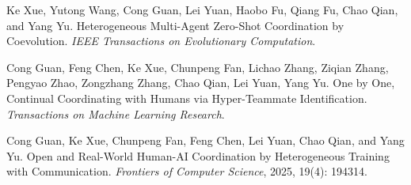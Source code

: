 \documentclass[11pt,a4paper]{article}
\begin{document}
\begin{cvbullet}
  \item Ke Xue, Yutong Wang, Cong Guan, Lei Yuan, Haobo Fu, Qiang Fu, Chao Qian, and Yang Yu. Heterogeneous Multi-Agent Zero-Shot Coordination by Coevolution. \textit{IEEE Transactions on Evolutionary Computation}.
  \item Cong Guan, Feng Chen, Ke Xue, Chunpeng Fan, Lichao Zhang, Ziqian Zhang, Pengyao Zhao, Zongzhang Zhang, Chao Qian, Lei Yuan, Yang Yu. One by One, Continual Coordinating with Humans via Hyper-Teammate Identification. \textit{Transactions on Machine Learning Research}.
  \item Cong Guan, Ke Xue, Chunpeng Fan, Feng Chen, Lei Yuan, Chao Qian, and Yang Yu. Open and Real-World Human-AI Coordination by Heterogeneous Training with Communication. \textit{Frontiers of Computer Science}, 2025, 19(4): 194314.
\end{cvbullet}
\end{document}

